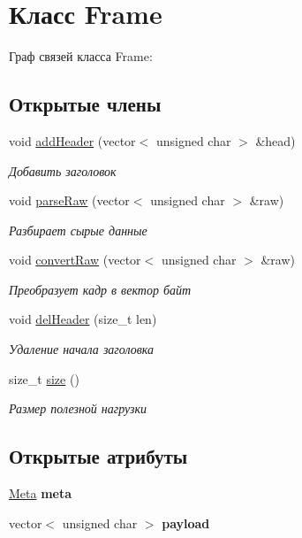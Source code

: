 \hypertarget{classFrame}{}\section{Класс Frame}
\label{classFrame}


Граф связей класса Frame\+:
\subsection*{Открытые члены}
\begin{DoxyCompactItemize}
\item 
void \hyperlink{classFrame_ae845a5e715edc77627ca09a68ec02b81}{add\+Header} (vector$<$ unsigned char $>$ \&head)
\begin{DoxyCompactList}\small\item\em Добавить заголовок \end{DoxyCompactList}\item 
void \hyperlink{classFrame_a47a5ecad8d5d88037796906e0e515c7f}{parse\+Raw} (vector$<$ unsigned char $>$ \&raw)
\begin{DoxyCompactList}\small\item\em Разбирает сырые данные \end{DoxyCompactList}\item 
void \hyperlink{classFrame_aa8b25be717e5d4879629b2c19afc4c8d}{convert\+Raw} (vector$<$ unsigned char $>$ \&raw)
\begin{DoxyCompactList}\small\item\em Преобразует кадр в вектор байт \end{DoxyCompactList}\item 
void \hyperlink{classFrame_a5a966008fbd55ba69ef8cff07ca39bf4}{del\+Header} (size\+\_\+t len)
\begin{DoxyCompactList}\small\item\em Удаление начала заголовка \end{DoxyCompactList}\item 
size\+\_\+t \hyperlink{classFrame_a451c2d259d060e8d0467378cc8eaa640}{size} ()
\begin{DoxyCompactList}\small\item\em Размер полезной нагрузки \end{DoxyCompactList}\end{DoxyCompactItemize}
\subsection*{Открытые атрибуты}
\begin{DoxyCompactItemize}
\item 
\mbox{\label{classFrame_a23708d5954409d03046a364f82363abf}} 
\hyperlink{classMeta}{Meta} {\bfseries meta}
\item 
\mbox{\label{classFrame_aa21300efdb7e1dfff11153c39cda931c}} 
vector$<$ unsigned char $>$ {\bfseries payload}
\end{DoxyCompactItemize}


